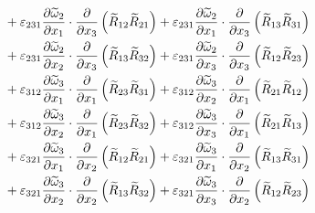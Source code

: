 \begin{equation}
\begin{split}
            &   +\varepsilon_{231}\pdv{\widetilde{\omega}_{2}}{x_{1}}\cdot\pdv{}{x_{3}}\left(\widetilde{R}_{12}\widetilde{R}_{21}\right)    
                +\varepsilon_{231}\pdv{\widetilde{\omega}_{2}}{x_{1}}\cdot\pdv{}{x_{3}}\left(\widetilde{R}_{13}\widetilde{R}_{31}\right)    \\
            &   +\varepsilon_{231}\pdv{\widetilde{\omega}_{2}}{x_{2}}\cdot\pdv{}{x_{3}}\left(\widetilde{R}_{13}\widetilde{R}_{32}\right)    
                +\varepsilon_{231}\pdv{\widetilde{\omega}_{2}}{x_{3}}\cdot\pdv{}{x_{3}}\left(\widetilde{R}_{12}\widetilde{R}_{23}\right)    \\
            &   +\varepsilon_{312}\pdv{\widetilde{\omega}_{3}}{x_{1}}\cdot\pdv{}{x_{1}}\left(\widetilde{R}_{23}\widetilde{R}_{31}\right)    
                +\varepsilon_{312}\pdv{\widetilde{\omega}_{3}}{x_{2}}\cdot\pdv{}{x_{1}}\left(\widetilde{R}_{21}\widetilde{R}_{12}\right)    \\
            &   +\varepsilon_{312}\pdv{\widetilde{\omega}_{3}}{x_{2}}\cdot\pdv{}{x_{1}}\left(\widetilde{R}_{23}\widetilde{R}_{32}\right)    
                +\varepsilon_{312}\pdv{\widetilde{\omega}_{3}}{x_{3}}\cdot\pdv{}{x_{1}}\left(\widetilde{R}_{21}\widetilde{R}_{13}\right)    \\
            &   +\varepsilon_{321}\pdv{\widetilde{\omega}_{3}}{x_{1}}\cdot\pdv{}{x_{2}}\left(\widetilde{R}_{12}\widetilde{R}_{21}\right)    
                +\varepsilon_{321}\pdv{\widetilde{\omega}_{3}}{x_{1}}\cdot\pdv{}{x_{2}}\left(\widetilde{R}_{13}\widetilde{R}_{31}\right)    \\
            &   +\varepsilon_{321}\pdv{\widetilde{\omega}_{3}}{x_{2}}\cdot\pdv{}{x_{2}}\left(\widetilde{R}_{13}\widetilde{R}_{32}\right)    
                +\varepsilon_{321}\pdv{\widetilde{\omega}_{3}}{x_{3}}\cdot\pdv{}{x_{2}}\left(\widetilde{R}_{12}\widetilde{R}_{23}\right)    
    \end{split}
\end{equation}

